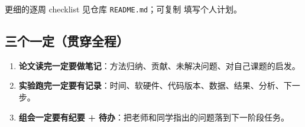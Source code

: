 更细的逐周 checklist 见仓库 \texttt{README.md}；可复制  填写个人计划。

\subsection{三个一定（贯穿全程）}
\begin{enumerate}
  \item \textbf{论文读完一定要做笔记}：方法归纳、贡献、未解决问题、对自己课题的启发。
  \item \textbf{实验跑完一定要有记录}：时间、软硬件、代码版本、数据、结果、分析、下一步。
  \item \textbf{组会一定要有纪要 + 待办}：把老师和同学指出的问题落到下一阶段任务。
\end{enumerate}
